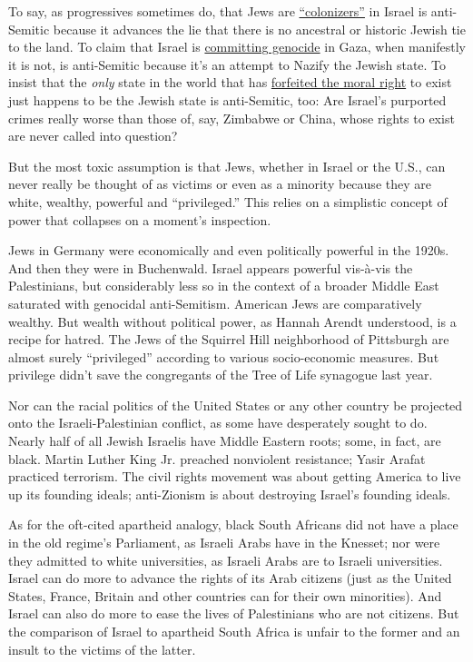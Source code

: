 To say, as progressives sometimes do, that Jews are
\href{https://people.socsci.tau.ac.il/mu/noah/files/2018/07/Ethnic-origin-and-identity-in-Israel-JEMS-2018.pdf}{``colonizers''}
in Israel is anti-Semitic because it advances the lie that there is no
ancestral or historic Jewish tie to the land. To claim that Israel is
\href{https://www.timesofisrael.com/uk-labour-mp-under-fire-for-accusing-israel-of-genocide-in-gaza-in-2012/}{committing
genocide} in Gaza, when manifestly it is not, is anti-Semitic because
it's an attempt to Nazify the Jewish state. To insist that the
\emph{only} state in the world that has
\href{https://www.counterpunch.org/2015/05/19/why-israel-should-not-exist/}{forfeited
the moral right} to exist just happens to be the Jewish state is
anti-Semitic, too: Are Israel's purported crimes really worse than those
of, say, Zimbabwe or China, whose rights to exist are never called into
question?

But the most toxic assumption is that Jews, whether in Israel or the
U.S., can never really be thought of as victims or even as a minority
because they are white, wealthy, powerful and ``privileged.'' This
relies on a simplistic concept of power that collapses on a moment's
inspection.

Jews in Germany were economically and even politically powerful in the
1920s. And then they were in Buchenwald. Israel appears powerful
vis-à-vis the Palestinians, but considerably less so in the context of a
broader Middle East saturated with genocidal anti-Semitism. American
Jews are comparatively wealthy. But wealth without political power, as
Hannah Arendt understood, is a recipe for hatred. The Jews of the
Squirrel Hill neighborhood of Pittsburgh are almost surely
``privileged'' according to various socio-economic measures. But
privilege didn't save the congregants of the Tree of Life synagogue last
year.

Nor can the racial politics of the United States or any other country be
projected onto the Israeli-Palestinian conflict, as some have
desperately sought to do. Nearly half of all Jewish Israelis have Middle
Eastern roots; some, in fact, are black. Martin Luther King Jr. preached
nonviolent resistance; Yasir Arafat practiced terrorism. The civil
rights movement was about getting America to live up its founding
ideals; anti-Zionism is about destroying Israel's founding ideals.

As for the oft-cited apartheid analogy, black South Africans did not
have a place in the old regime's Parliament, as Israeli Arabs have in
the Knesset; nor were they admitted to white universities, as Israeli
Arabs are to Israeli universities. Israel can do more to advance the
rights of its Arab citizens (just as the United States, France, Britain
and other countries can for their own minorities). And Israel can also
do more to ease the lives of Palestinians who are not citizens. But the
comparison of Israel to apartheid South Africa is unfair to the former
and an insult to the victims of the latter.

